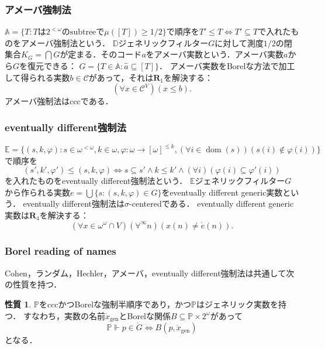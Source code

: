 \documentclass[uplatex,dvipdfmx]{jsarticle}
\renewcommand{\P}{\mathbb{P}}
\newcommand{\dom}{\operatorname{dom}}
\newcommand\forces{\Vdash}
\newcommand{\relR}{\mathbf{R}}
\renewcommand\subset{\subseteq}
\theoremstyle{definition}
\newtheorem{property}[thm]{性質}
\begin{document}
		\subsubsection{アメーバ強制法}
		
		$\mathbb{A} = \{ T : T\text{は}2^{<\omega}\text{のsubtreeで}\mu([T])\ge 1/2 \}$で順序を$T' \le T \iff T' \subset T$で入れたものをアメーバ強制法という．
		$\mathbb{D}$ジェネリックフィルター$G$に対して測度$1/2$の閉集合$K_G = \bigcap G$が定まる．そのコード$a$をアメーバ実数という．アメーバ実数$a$から$G$を復元できる： $G = \{ T \in \mathbb{A} : \hat{a} \subset [T] \}$．
		アメーバ実数をBorelな方法で加工して得られる実数$b \in \mathcal{C}$があって，それは$\relR_1$を解決する：
		\[
		(\forall x \in \mathcal{C}^V) (x \le b).
		\]
		アメーバ強制法はcccである．
		
		\subsubsection{eventually different強制法}
		
		$\mathbb{E} = \{ (s,k,\varphi) : s \in \omega^{<\omega}, k \in \omega, \varphi \colon \omega \to [\omega]^{\le k}, (\forall i \in \dom(s))(s(i) \not \in \varphi(i)) \}$で順序を
		\[
		(s', k', \varphi') \le (s, k, \varphi) \iff s \subset s' \land k \le k' \land (\forall i)(\varphi(i) \subset \varphi'(i))
		\]
		を入れたものをeventually different強制法という．	
		$\mathbb{E}$ジェネリックフィルター$G$から作られる実数$e = \bigcup \{ s  : (s, k, \varphi) \in G \}$をeventually different generic実数という．
		eventually different強制法は$\sigma$-centeredである．
		eventually different generic実数は$\relR_4$を解決する：
		\[
		(\forall x \in \omega^\omega \cap V)(\forall^\infty n)(x(n) \ne \dot{e}(n)).
		\]
		
		\subsubsection{Borel reading of names}
		
		Cohen，ランダム，Hechler，アメーバ，eventually different強制法は共通して次の性質を持つ．
		
		\begin{property}\label{property:hasgenericreal}
			$\P$をcccかつBorelな強制半順序であり，かつ$\P$はジェネリック実数を持つ．
			すなわち，実数の名前$\dot{x}_\mathrm{gen}$とBorelな関係$B \subset \P \times 2^\omega$があって
			\[
			\P \forces p \in \dot{G} \iff B(p, \dot{x}_\mathrm{gen})
			\]
			となる．
		\end{property}
	
\end{document}
